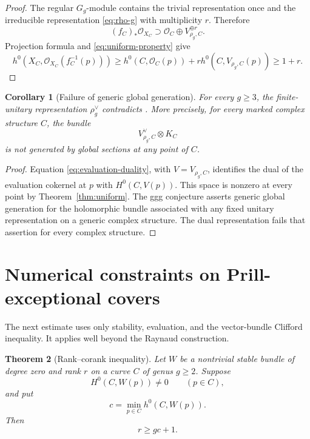 \documentclass[11pt,reqno]{amsart}
\numberwithin{equation}{section}
\newtheorem{theorem}{Theorem}[section]
\newtheorem{corollary}[theorem]{Corollary}
\theoremstyle{definition}
\theoremstyle{remark}
\newcommand{\OO}{\mathcal O}
\begin{document}
\begin{proof}
The regular $G_g$-module contains the trivial representation once and the irreducible representation \eqref{eq:rho-g} with multiplicity $r$.  Therefore
\[
(f_C)_*\OO_{X_C}
\supset\OO_C\oplus V_{\rho_g,C}^{\oplus r}.
\]
Projection formula and \eqref{eq:uniform-property} give
\[
h^0\!\left(X_C,\OO_{X_C}(f_C^{-1}(p))\right)
\ge h^0(C,\OO_C(p))+r h^0(C,V_{\rho_g,C}(p))
\ge1+r.
\]
\end{proof}

\begin{corollary}[Failure of generic global generation]\label{cor:ggg}
For every $g\ge3$, the finite-unitary representation $\rho_g^\vee$ contradicts \cite[Conjecture~6.3.5]{Litt2024}.  More precisely, for every marked complex structure $C$, the bundle
\[
V_{\rho_g,C}^\vee\otimes K_C
\]
is not generated by global sections at any point of $C$.
\end{corollary}

\begin{proof}
Equation \eqref{eq:evaluation-duality}, with $V=V_{\rho_g,C}$, identifies the dual of the evaluation cokernel at $p$ with $H^0(C,V(p))$.  This space is nonzero at every point by Theorem~\ref{thm:uniform}.  The ggg conjecture asserts generic global generation for the holomorphic bundle associated with any fixed unitary representation on a generic complex structure.  The dual representation fails that assertion for every complex structure.
\end{proof}

\section{Numerical constraints on Prill-exceptional covers}\label{sec:degree}

The next estimate uses only stability, evaluation, and the vector-bundle Clifford inequality.  It applies well beyond the Raynaud construction.

\begin{theorem}[Rank--corank inequality]\label{thm:rank-corank}
Let $W$ be a nontrivial stable bundle of degree zero and rank $r$ on a curve $C$ of genus $g\ge2$.  Suppose
\[
H^0(C,W(p))\ne0\qquad(p\in C),
\]
and put
\[
c=\min_{p\in C}h^0(C,W(p)).
\]
Then
\begin{equation}\label{eq:rank-corank}
r\ge gc+1.
\end{equation}
\end{theorem}
\end{document}
